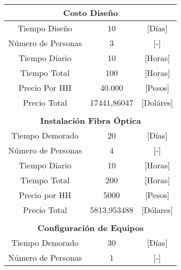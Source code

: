 \begin{table}[H]
\begin{tabular}{ccc}
\hline
\multicolumn{3}{|c|}{\textbf{Costo Diseño}} \\ \hline
\multicolumn{1}{|c|}{Tiempo Diseño} & \multicolumn{1}{c|}{10} & \multicolumn{1}{c|}{{[}Días{]}} \\ \hline
\multicolumn{1}{|c|}{Número de Personas} & \multicolumn{1}{c|}{3} & \multicolumn{1}{c|}{{[}-{]}} \\ \hline
\multicolumn{1}{|c|}{Tiempo Diario} & \multicolumn{1}{c|}{10} & \multicolumn{1}{c|}{{[}Horas{]}} \\ \hline
\multicolumn{1}{|c|}{Tiempo Total} & \multicolumn{1}{c|}{100} & \multicolumn{1}{c|}{{[}Horas{]}} \\ \hline
\multicolumn{1}{|c|}{Precio Por HH} & \multicolumn{1}{c|}{40.000} & \multicolumn{1}{c|}{{[}Pesos{]}} \\ \hline
\multicolumn{1}{|c|}{Precio Total} & \multicolumn{1}{c|}{17441,86047} & \multicolumn{1}{c|}{{[}Doláres{]}} \\ \hline
 &  &  \\ \hline
\multicolumn{3}{|c|}{\textbf{Instalación Fibra Óptica}} \\ \hline
\multicolumn{1}{|c|}{Tiempo Demorado} & \multicolumn{1}{c|}{20} & \multicolumn{1}{c|}{{[}Días{]}} \\ \hline
\multicolumn{1}{|c|}{Número de Personas} & \multicolumn{1}{c|}{4} & \multicolumn{1}{c|}{{[}-{]}} \\ \hline
\multicolumn{1}{|c|}{Tiempo Diario} & \multicolumn{1}{c|}{10} & \multicolumn{1}{c|}{{[}Horas{]}} \\ \hline
\multicolumn{1}{|c|}{Tiempo Total} & \multicolumn{1}{c|}{200} & \multicolumn{1}{c|}{{[}Horas{]}} \\ \hline
\multicolumn{1}{|c|}{Precio por HH} & \multicolumn{1}{c|}{5000} & \multicolumn{1}{c|}{{[}Pesos{]}} \\ \hline
\multicolumn{1}{|c|}{Precio Total} & \multicolumn{1}{c|}{5813,953488} & \multicolumn{1}{c|}{{[}Dólares{]}} \\ \hline
 &  &  \\ \hline
\multicolumn{3}{|c|}{\textbf{Configuración de Equipos}} \\ \hline
\multicolumn{1}{|c|}{Tiempo Demorado} & \multicolumn{1}{c|}{30} & \multicolumn{1}{c|}{{[}Días{]}} \\ \hline
\multicolumn{1}{|c|}{Número de Personas} & \multicolumn{1}{c|}{1} & \multicolumn{1}{c|}{{[}-{]}} \\ \hline

\end{tabular}
\end{table}
